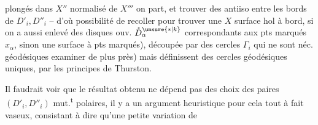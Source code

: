 plongés dans $X''$ normalisé de $X'''$   on part, et  trouver des antiiso entre les bords  de $D'_i,D''_i$ -- d'où possibilité de recoller pour trouver une $X$ surface hol à bord, si on a aussi enlevé des disques ouv. $\mathring D_{\alpha}^{\unsure{*|k}}$ correspondants aux pts marqués $x_{\alpha}$, sinon une surface à pts marqués), découpée par des cercles $\Gamma_i$ qui ne sont   néc. géodésiques   examiner de plus près) mais définissent des cercles géodésiques uniques, par les principes de Thurston.

Il faudrait voir que le résultat obtenu ne dépend pas des choix des paires $(D'_i,D''_i)$ mut.\textsuperscript{t} polaires, il y a un argument heuristique pour cela tout à fait vaseux, consistant à dire qu'une petite variation de 
